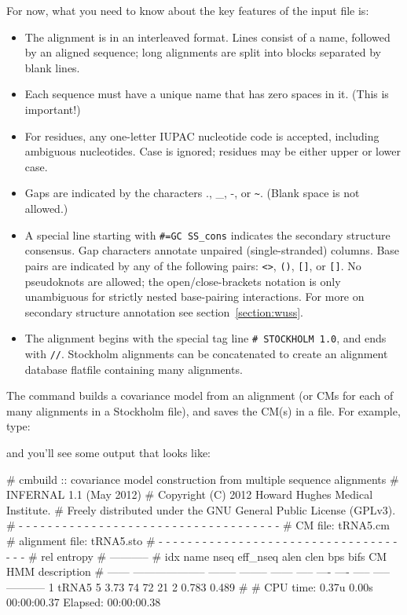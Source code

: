 For now, what you need to know about the key features of the input file is:
\begin{itemize}
\item The alignment is in an interleaved format.
Lines consist of a name, followed by an aligned sequence;
long alignments are split into blocks separated by blank lines.
\item Each sequence must have a unique name that has zero spaces in it. (This is important!)
\item For residues, any one-letter IUPAC nucleotide code is accepted,
      including ambiguous nucleotides. Case is ignored; residues
      may be either upper or lower case.
\item Gaps are indicated by the characters ., \_, -, or \verb+~+.
      (Blank space is not allowed.)
\item A special line starting with {\small\verb+#=GC SS_cons+} indicates
      the secondary structure consensus. Gap characters annotate
      unpaired (single-stranded) columns. Base pairs are indicated
      by any of the following pairs: \verb+<>+, \verb+()+, \verb+[]+,
      or \verb+[]+. No pseudoknots are allowed; the
      open/close-brackets notation is only unambiguous for strictly
      nested base-pairing interactions.
      For more on secondary structure annotation see
      section~\ref{section:wuss}.
\item The alignment begins with the special tag line
      {\small\verb+# STOCKHOLM 1.0+}, and ends with {\small\verb+//+}.
      Stockholm alignments
      can be concatenated to create an alignment database flatfile
      containing many alignments.
\end{itemize}

The  command builds a covariance model from an alignment (or
CMs for each of many alignments in a Stockholm file), and saves the
CM(s) in a file. For example, type:


and you'll see some output that looks like:

\begin{sreoutput}
# cmbuild :: covariance model construction from multiple sequence alignments
# INFERNAL 1.1 (May 2012)
# Copyright (C) 2012 Howard Hughes Medical Institute.
# Freely distributed under the GNU General Public License (GPLv3).
# - - - - - - - - - - - - - - - - - - - - - - - - - - - - - - - - - - - -
# CM file:                                            tRNA5.cm
# alignment file:                                     tRNA5.sto
# - - - - - - - - - - - - - - - - - - - - - - - - - - - - - - - - - - - -
#                                                                      rel entropy
#                                                                      -----------
# idx    name                     nseq eff_nseq   alen  clen  bps bifs    CM   HMM description
# ------ -------------------- -------- -------- ------ ----- ---- ---- ----- ----- -----------
       1 tRNA5                       5     3.73     74    72   21    2 0.783 0.489 
#
# CPU time: 0.37u 0.00s 00:00:00.37 Elapsed: 00:00:00.38
\end{sreoutput}

